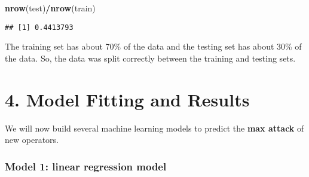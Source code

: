 \documentclass[
]{article}
\newenvironment{Shaded}{\begin{snugshade}}{\end{snugshade}}
\newcommand{\AttributeTok}[1]{\textcolor[rgb]{0.13,0.29,0.53}{#1}}
\newcommand{\CommentTok}[1]{\textcolor[rgb]{0.56,0.35,0.01}{\textit{#1}}}
\newcommand{\FunctionTok}[1]{\textcolor[rgb]{0.13,0.29,0.53}{\textbf{#1}}}
\newcommand{\NormalTok}[1]{#1}
\newcommand{\OtherTok}[1]{\textcolor[rgb]{0.56,0.35,0.01}{#1}}
\newcommand{\SpecialCharTok}[1]{\textcolor[rgb]{0.81,0.36,0.00}{\textbf{#1}}}
\newcommand{\StringTok}[1]{\textcolor[rgb]{0.31,0.60,0.02}{#1}}
\begin{document}
\begin{Shaded}
\begin{Highlighting}[]
\FunctionTok{nrow}\NormalTok{(test)}\SpecialCharTok{/}\FunctionTok{nrow}\NormalTok{(train)}
\end{Highlighting}
\end{Shaded}

\begin{verbatim}
## [1] 0.4413793
\end{verbatim}

The training set has about 70\% of the data and the testing set has
about 30\% of the data. So, the data was split correctly between the
training and testing sets.

\section{4. Model Fitting and Results}\label{model-fitting-and-results}

We will now build several machine learning models to predict the
\textbf{max attack} of new operators.

\subsubsection{Model 1: linear regression
model}\label{model-1-linear-regression-model}

\begin{Shaded}
\end{Shaded}
\end{document}
